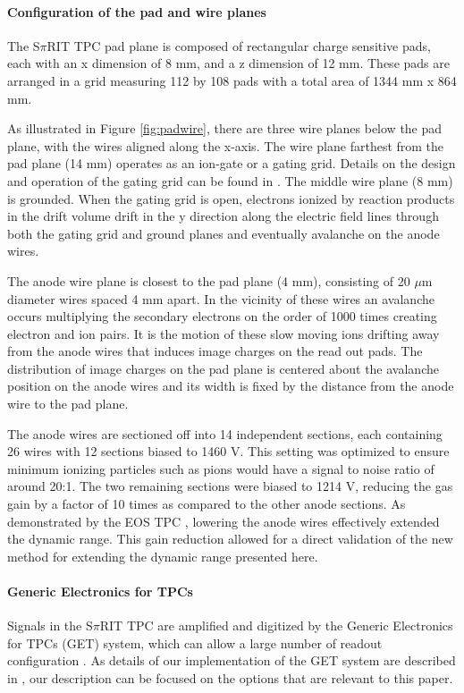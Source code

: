\documentclass[review]{elsarticle}
\begin{document}
\paragraph{Configuration of the pad and wire planes} 
The S$\pi$RIT TPC pad plane is composed of rectangular charge sensitive pads, each with an x dimension of 8 mm, and a z dimension of 12 mm. These pads are arranged in a grid measuring 112 by 108 pads with a total area of 1344 mm x 864 mm.

As illustrated in Figure \ref{fig:padwire}, there are three wire planes below the pad plane, with the wires aligned along the x-axis. The wire plane farthest from the pad plane (14 mm) operates as an ion-gate or a gating grid. Details on the design and operation of the gating grid can be found in \cite{suwat}. The middle wire plane (8 mm) is grounded. When the gating grid is open, electrons ionized by reaction products in the drift volume drift in the y direction along the electric field lines through both the gating grid and ground planes and eventually avalanche on the anode wires. 

The anode wire plane is closest to the pad plane (4 mm), consisting of 20 $\mu$m diameter wires spaced 4 mm apart. In the vicinity of these wires an avalanche occurs multiplying the secondary electrons on the order of 1000 times creating electron and ion pairs. It is the motion of these slow moving ions drifting away from the anode wires that induces image charges on the read out pads. The distribution of image charges on the pad plane is centered about the avalanche position on the anode wires and its width is fixed by the distance from the anode wire to the pad plane. 

The anode wires are sectioned off into 14 independent sections, each containing 26 wires with 12 sections biased to 1460 V. This setting was optimized to ensure minimum ionizing particles such as pions would have a signal to noise ratio of around 20:1. The two remaining sections were biased to 1214 V, reducing the gas gain by a factor of 10 times as compared to the other anode sections. As demonstrated by the EOS TPC \citep{eos}, lowering the anode wires effectively extended the dynamic range.  This gain reduction allowed for a direct validation of the new method for extending the dynamic range presented here. 

\paragraph{Generic Electronics for TPCs}
Signals in the S$\pi$RIT TPC are amplified and digitized by the Generic Electronics for TPCs (GET) system, which can allow a large number of readout configuration \cite{get}. As details of our implementation of the GET system are described in \citep{aki}, our description can be focused on the options that are relevant to this paper.
\end{document}

